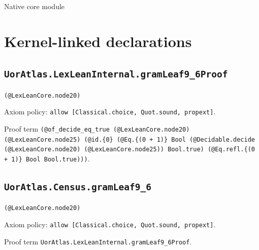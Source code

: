\documentclass[11pt]{article}
\begin{document}
\begin{center}{\LARGE Native core module}\end{center}
\section*{Kernel-linked declarations}
\subsection*{\texttt{UorAtlas.LexLeanInternal.gramLeaf9\_6Proof}}
\noindent\texttt{(@LexLeanCore.node20)}\par
\noindent Axiom policy: \texttt{allow [Classical.choice, Quot.sound, propext]}.\par
\noindent Proof term \texttt{(@of\_decide\_eq\_true (@LexLeanCore.node20) (@LexLeanCore.node25) (@id.\{0\} (@Eq.\{(0 + 1)\} Bool (@Decidable.decide (@LexLeanCore.node20) (@LexLeanCore.node25)) Bool.true) (@Eq.refl.\{(0 + 1)\} Bool Bool.true)))}.\par
\subsection*{\texttt{UorAtlas.Census.gramLeaf9\_6}}
\noindent\texttt{(@LexLeanCore.node20)}\par
\noindent Axiom policy: \texttt{allow [Classical.choice, Quot.sound, propext]}.\par
\noindent Proof term \texttt{UorAtlas.LexLeanInternal.gramLeaf9\_6Proof}.\par
\end{document}
